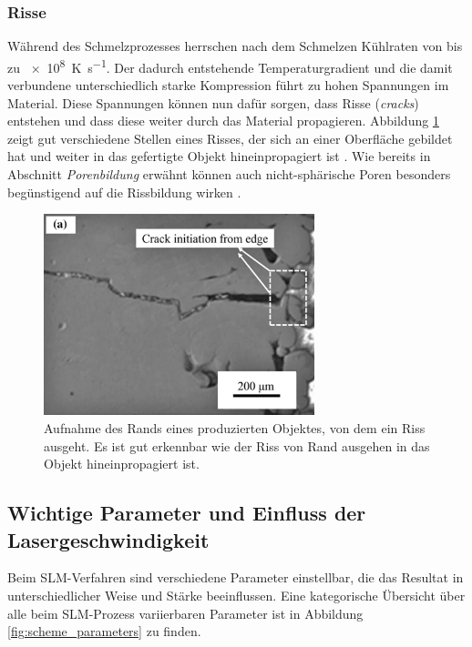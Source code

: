 		\subsubsection{Risse}
		Während des Schmelzprozesses herrschen nach dem Schmelzen Kühlraten von bis zu
		\SI{e8}{\kelvin\per\second}. Der dadurch entstehende Temperaturgradient und die damit
		verbundene unterschiedlich starke Kompression führt zu hohen Spannungen im Material.
		Diese Spannungen können nun dafür sorgen, dass Risse (\emph{cracks}) entstehen und dass
		diese weiter durch das Material propagieren. Abbildung \ref{fig:defects_cracks} zeigt gut
		verschiedene Stellen eines Risses, der sich an einer Oberfläche gebildet hat und weiter in
		das gefertigte Objekt hineinpropagiert ist \cite{zhang2017defect}. Wie bereits in
		Abschnitt \emph{Porenbildung} erwähnt können auch nicht-sphärische Poren besonders
		begünstigend auf die Rissbildung wirken \cite{galy2018main}.

		\begin{figure}[!ht]
			\centering
			\includegraphics[width=0.7\textwidth]{chapter/main/img/defects/cracks_part.png}
			\caption{Aufnahme des Rands eines produzierten Objektes, von dem ein Riss ausgeht. Es
			ist gut erkennbar wie der Riss von Rand ausgehen in das Objekt hineinpropagiert ist.
			\cite{zhang2017defect}}
			\label{fig:defects_cracks}
		\end{figure}

	\subsection{Wichtige Parameter und Einfluss der Lasergeschwindigkeit}
		Beim SLM-Verfahren sind verschiedene Parameter einstellbar, die das Resultat in
		unterschiedlicher Weise und Stärke beeinflussen. Eine kategorische Übersicht über alle
		beim SLM-Prozess variierbaren Parameter ist in Abbildung \ref{fig:scheme_parameters} zu
		finden.

